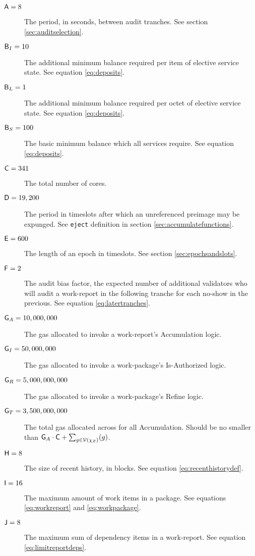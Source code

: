 \begin{description}
  \item[$\mathsf{A} = 8$] The period, in seconds, between audit tranches. See section \ref{sec:auditselection}.
  \item[$\mathsf{B}_I = 10$] The additional minimum balance required per item of elective service state. See equation \ref{eq:deposits}.
  \item[$\mathsf{B}_L = 1$] The additional minimum balance required per octet of elective service state. See equation \ref{eq:deposits}.
  \item[$\mathsf{B}_S = 100$] The basic minimum balance which all services require. See equation \ref{eq:deposits}.
  \item[$\mathsf{C} = 341$] The total number of cores.
  \item[$\mathsf{D} = 19,200$] The period in timeslots after which an unreferenced preimage may be expunged. See \texttt{eject} definition in section \ref{sec:accumulatefunctions}.
  \item[$\mathsf{E} = 600$] The length of an epoch in timeslots. See section \ref{sec:epochsandslots}.
  \item[$\mathsf{F} = 2$] The audit bias factor, the expected number of additional validators who will audit a work-report in the following tranche for each no-show in the previous. See equation \ref{eq:latertranches}.
  \item[$\mathsf{G}_A = 10,000,000$] The gas allocated to invoke a work-report's Accumulation logic.
  \item[$\mathsf{G}_I = 50,000,000$] The gas allocated to invoke a work-package's Is-Authorized logic.
  \item[$\mathsf{G}_R = 5,000,000,000$] The gas allocated to invoke a work-package's Refine logic.
  \item[$\mathsf{G}_T = 3,500,000,000$] The total gas allocated across for all Accumulation. Should be no smaller than $\Creportaccgas\cdot\Ccorecount + \sum_{g \in \values{\alwaysaccers}}(g)$.
  \item[$\mathsf{H} = 8$] The size of recent history, in blocks. See equation \ref{eq:recenthistorydef}.
  \item[$\mathsf{I} = 16$] The maximum amount of work items in a package. See equations \ref{eq:workreport} and \ref{eq:workpackage}.
  \item[$\mathsf{J} = 8$] The maximum sum of dependency items in a work-report. See equation \ref{eq:limitreportdeps}.

\end{description}
